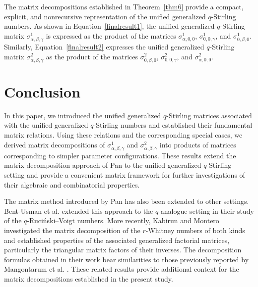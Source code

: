 \documentclass[12pt]{article}
\begin{document}
The matrix decompositions established in Theorem~\ref{thm6} provide a compact, explicit, and nonrecursive representation of the unified generalized $q$-Stirling numbers. As shown in Equation~\eqref{finalresult1}, the unified generalized $q$-Stirling matrix $\sigma^1_{\alpha,\beta,\gamma}$ is expressed as the product of the matrices $\sigma^1_{\alpha,0,0}$, $\sigma^1_{0,0,\gamma}$, and $\sigma^1_{0,\beta,0}$. Similarly, Equation~\eqref{finalresult2} expresses the unified generalized $q$-Stirling matrix $\sigma^2_{\alpha,\beta,\gamma}$ as the product of the matrices $\sigma^2_{0,\beta,0}$, $\sigma^2_{0,0,\gamma}$, and $\sigma^2_{\alpha,0,0}$.

\section{Conclusion}

In this paper, we introduced the unified generalized $q$-Stirling matrices associated with the unified generalized $q$-Stirling numbers and established their fundamental matrix relations. Using these relations and the corresponding special cases, we derived matrix decompositions of $\sigma^1_{\alpha,\beta,\gamma}$ and $\sigma^2_{\alpha,\beta,\gamma}$ into products of matrices corresponding to simpler parameter configurations. These results extend the matrix decomposition approach of Pan \cite{Pan} to the unified generalized $q$-Stirling setting and provide a convenient matrix framework for further investigations of their algebraic and combinatorial properties.

The matrix method introduced by Pan \cite{Pan} has also been extended to other settings. Bent-Usman et al. \cite{Wardah} extended this approach to the $q$-analogue setting in their study of the $q$-Ruci\'nski--Voigt numbers. More recently, Kabirun and Montero \cite{Kabirun} investigated the matrix decomposition of the $r$-Whitney numbers of both kinds and established properties of the associated generalized factorial matrices, particularly the triangular matrix factors of their inverses. The decomposition formulas obtained in their work bear similarities to those previously reported by Mangontarum et al. \cite{Mangontarum5}. These related results provide additional context for the matrix decompositions established in the present study.
\end{document}
